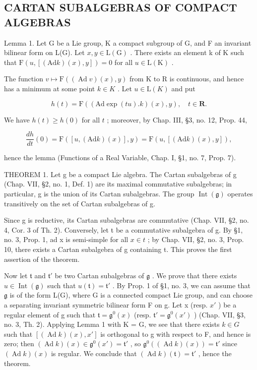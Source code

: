 \subsection{CARTAN SUBALGEBRAS OF COMPACT ALGEBRAS}

Lemma 1. Let G be a Lie group, K a compact subgroup of G, and F an invariant bilinear form on L(G). Let \(x, y \in \mathrm{L}(\mathrm{G})\) . There exists an element k of K such that \(\mathrm{F}(u, [(\mathrm{Ad}k)(x), y]) = 0\) for all \(u \in \mathrm{L}(\mathrm{K})\) .

The function \(v \mapsto \mathrm{F}((\operatorname{Ad} v)(x), y)\) from K to R is continuous, and hence has a minimum at some point \(k \in K\) . Let \(u \in \mathrm{L}(K)\) and put

\[
h (t) = \mathrm{F} ((\mathrm{Ad} \exp (t u). k) (x), y), \quad t \in \mathbf {R}.
\]

We have \(h(t) \geq h(0)\) for all \(t\) ; moreover, by Chap. III, §3, no. 12, Prop. 44,

\[
\frac {d h}{d t} (0) = \mathrm{F} ([ u, (\mathrm{Ad} k) (x) ], y) = \mathrm{F} (u, [ (\mathrm{Ad} k) (x), y ]),
\]

hence the lemma (Functions of a Real Variable, Chap. I, §1, no. 7, Prop. 7).

THEOREM 1. Let g be a compact Lie algebra. The Cartan subalgebras of g (Chap. VII, §2, no. 1, Def. 1) are its maximal commutative subalgebras; in particular, g is the union of its Cartan subalgebras. The group \(\operatorname{Int}(\mathfrak{g})\) operates transitively on the set of Cartan subalgebras of g.

Since g is reductive, its Cartan subalgebras are commutative (Chap. VII, §2, no. 4, Cor. 3 of Th. 2). Conversely, let t be a commutative subalgebra of g. By §1, no. 3, Prop. 1, ad x is semi-simple for all \(x \in t\) ; by Chap. VII, §2, no. 3, Prop. 10, there exists a Cartan subalgebra of g containing t. This proves the first assertion of the theorem.

Now let \(\mathfrak{t}\) and \(\mathfrak{t}'\) be two Cartan subalgebras of \(\mathfrak{g}\) . We prove that there exists \(u \in \operatorname{Int}(\mathfrak{g})\) such that \(u(\mathfrak{t}) = \mathfrak{t}'\) . By Prop. 1 of §1, no. 3, we can assume that \(\mathfrak{g}\) is of the form L(G), where G is a connected compact Lie group, and can choose a separating invariant symmetric bilinear form F on g. Let x (resp. \(x'\) ) be a regular element of g such that \(\mathfrak{t} = \mathfrak{g}^{0}(x)\) (resp. \(\mathfrak{t}' = \mathfrak{g}^{0}(x')\) ) (Chap. VII, §3, no. 3, Th. 2). Applying Lemma 1 with K = G, we see that there exists \(k \in G\) such that \([(\operatorname{Ad} k)(x), x']\) is orthogonal to g with respect to F, and hence is zero; then \((\operatorname{Ad} k)(x) \in \mathfrak{g}^{0}(x') = \mathfrak{t}'\) , so \(\mathfrak{g}^{0}((\operatorname{Ad} k)(x)) = \mathfrak{t}'\) since \((\operatorname{Ad} k)(x)\) is regular. We conclude that \((\operatorname{Ad} k)(\mathfrak{t}) = \mathfrak{t}'\) , hence the theorem.

